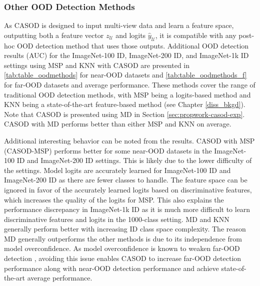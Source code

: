 \subsubsection{Other OOD Detection Methods}
\label{sec:suppmat-ood}

As CASOD is designed to input multi-view data and learn a feature space, outputting both a feature vector $z_{\mathcal{U}}$ and logits $\hat{y}_{\mathcal{U}}$, it is compatible with any post-hoc OOD detection method that uses those outputs. Additional OOD detection results (AUC) for the ImageNet-100 ID, ImageNet-200 ID, and ImageNet-1k ID settings using MSP \cite{hendrycks2017baseline} and KNN \cite{sun2022out} with CASOD are presented in \ref{tab:table_oodmethods} for near-OOD datasets and \ref{tab:table_oodmethods_f} for far-OOD datasets and average performance. These methods cover the range of traditional OOD detection methods, with MSP being a logits-based method and KNN being a state-of-the-art feature-based method (see Chapter \ref{diss_bkgd}). Note that CASOD is presented using MD in Section \ref{sec:propwork-casod-exp}. CASOD with MD performs better than either MSP and KNN on average.

Additional interesting behavior can be noted from the results. CASOD with MSP (CASOD-MSP) performs better for some near-OOD datasets in the ImageNet-100 ID and ImageNet-200 ID settings. This is likely due to the lower difficulty of the settings. %
Model logits are accurately learned for ImageNet-100 ID and ImageNet-200 ID as there are fewer classes to handle. The feature space can be ignored in favor of the accurately learned logits based on discriminative features, which increases the quality of the logits for MSP. This also explains the performance discrepancy in ImageNet-1k ID as it is much more difficult to learn discriminative features and logits in the 1000-class setting. MD and KNN generally perform better with increasing ID class space complexity.
The reason MD generally outperforms the other methods is due to its independence from model overconfidence. As model overconfidence is known to weaken far-OOD detection \cite{nguyen2015deep,hendrycks2017baseline,wei2022mitigating,lee2018simple}, avoiding this issue enables CASOD to increase far-OOD detection performance along with near-OOD detection performance and achieve state-of-the-art average performance.

